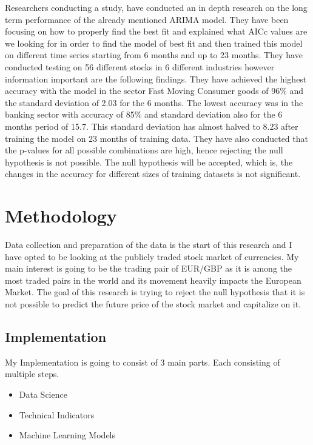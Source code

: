 \documentclass{imc-inf}
\begin{document}
		Researchers conducting a study, \cite{arima} have conducted an in depth research on the long term performance of the already mentioned ARIMA model.
		They have been focusing on how to properly find the best fit and explained what AICc values are we looking for in order to find the model of best fit
		and then trained this model on different time series starting from 6 months and up to 23 months. They have conducted testing on 56 different stocks 
		in 6 different industries however information important are the following findings. They have achieved the highest accuracy with the model in the 
		sector Fast Moving Consumer goods of 96\% and the standard deviation of 2.03 for the 6 months. The lowest accuracy was in the banking sector with
		accuracy of 85\% and standard deviation also for the 6 months period of 15.7. This standard deviation has almost halved to 8.23 after training
		the model on 23 months of training data. They have also conducted that the p-values for all possible combinations are high, hence rejecting 
		the null hypothesis is not possible. The null hypothesis will be accepted, which is, the changes in the accuracy for different sizes of training
		datasets is not significant.

\chapter{Methodology}\label{chap:methodology}
Data collection and preparation of the data is the start of this research and I have opted to be looking at the publicly traded stock market of currencies.
My main interest is going to be the trading pair of EUR/GBP as it is among the most traded pairs in the world and its movement heavily impacts the European Market.
The goal of this research is trying to reject the null hypothesis that it is not possible to predict the future price of the stock market and capitalize on it. 

\section{Implementation}
My Implementation is going to consist of 3 main parts. Each consisting of multiple steps.
	\begin{itemize}
		\item Data Science
		\item Technical Indicators
		\item Machine Learning Models
	\end{itemize}
\end{document}
